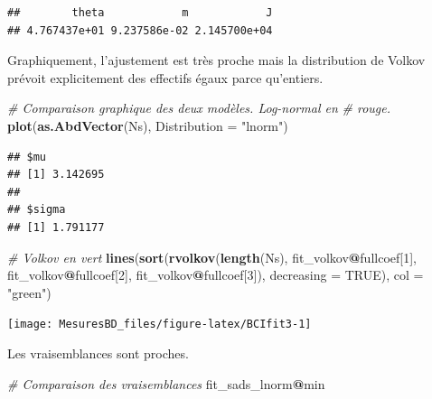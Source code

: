 \documentclass[
  11pt,
  french,
  a4paper,
  extrafontsizes,onecolumn,openright
  ]{memoir}
\newenvironment{Shaded}{\begin{snugshade}}{\end{snugshade}}
\newcommand{\CommentTok}[1]{\textcolor[rgb]{0.56,0.35,0.01}{\textit{#1}}}
\newcommand{\DataTypeTok}[1]{\textcolor[rgb]{0.13,0.29,0.53}{#1}}
\newcommand{\DecValTok}[1]{\textcolor[rgb]{0.00,0.00,0.81}{#1}}
\newcommand{\KeywordTok}[1]{\textcolor[rgb]{0.13,0.29,0.53}{\textbf{#1}}}
\newcommand{\NormalTok}[1]{#1}
\newcommand{\OperatorTok}[1]{\textcolor[rgb]{0.81,0.36,0.00}{\textbf{#1}}}
\newcommand{\OtherTok}[1]{\textcolor[rgb]{0.56,0.35,0.01}{#1}}
\newcommand{\StringTok}[1]{\textcolor[rgb]{0.31,0.60,0.02}{#1}}
\begin{document}
\begin{verbatim}
##        theta            m            J 
## 4.767437e+01 9.237586e-02 2.145700e+04
\end{verbatim}

\normalsize

Graphiquement, l'ajustement est très proche mais la distribution de Volkov prévoit explicitement des effectifs égaux parce qu'entiers.

\scriptsize

\begin{Shaded}
\begin{Highlighting}[]
\CommentTok{# Comparaison graphique des deux modèles. Log-normal en}
\CommentTok{# rouge.}
\KeywordTok{plot}\NormalTok{(}\KeywordTok{as.AbdVector}\NormalTok{(Ns), }\DataTypeTok{Distribution =} \StringTok{"lnorm"}\NormalTok{)}
\end{Highlighting}
\end{Shaded}

\begin{verbatim}
## $mu
## [1] 3.142695
## 
## $sigma
## [1] 1.791177
\end{verbatim}

\begin{Shaded}
\begin{Highlighting}[]
\CommentTok{# Volkov en vert}
\KeywordTok{lines}\NormalTok{(}\KeywordTok{sort}\NormalTok{(}\KeywordTok{rvolkov}\NormalTok{(}\KeywordTok{length}\NormalTok{(Ns), fit_volkov}\OperatorTok{@}\NormalTok{fullcoef[}\DecValTok{1}\NormalTok{], fit_volkov}\OperatorTok{@}\NormalTok{fullcoef[}\DecValTok{2}\NormalTok{],}
\NormalTok{    fit_volkov}\OperatorTok{@}\NormalTok{fullcoef[}\DecValTok{3}\NormalTok{]), }\DataTypeTok{decreasing =} \OtherTok{TRUE}\NormalTok{), }\DataTypeTok{col =} \StringTok{"green"}\NormalTok{)}
\end{Highlighting}
\end{Shaded}

\begin{center}\texttt{[image: MesuresBD\_files/figure-latex/BCIfit3-1]} \end{center}

\normalsize

Les vraisemblances sont proches.

\scriptsize

\begin{Shaded}
\begin{Highlighting}[]
\CommentTok{# Comparaison des vraisemblances}
\NormalTok{fit_sads_lnorm}\OperatorTok{@}\NormalTok{min}
\end{Highlighting}
\end{Shaded}
\end{document}
